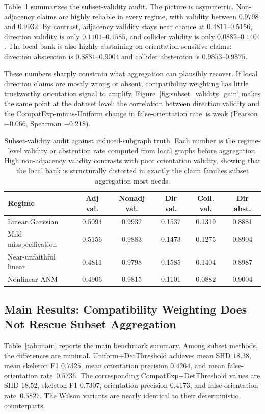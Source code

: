 \documentclass{article}
\newcommand{\method}{CompatExp}
\newcommand{\forate}{false-orientation rate}
\begin{document}
Table~\ref{tab:audit} summarizes the subset-validity audit. The picture is asymmetric. Non-adjacency claims are highly reliable in every regime, with validity between $0.9798$ and $0.9932$. By contrast, adjacency validity stays near chance at $0.4811$--$0.5156$, direction validity is only $0.1101$--$0.1585$, and collider validity is only $0.0882$--$0.1404$. The local bank is also highly abstaining on orientation-sensitive claims: direction abstention is $0.8881$--$0.9004$ and collider abstention is $0.9853$--$0.9875$.

These numbers sharply constrain what aggregation can plausibly recover. If local direction claims are mostly wrong or absent, compatibility weighting has little trustworthy orientation signal to amplify. Figure~\ref{fig:subset_validity_gain} makes the same point at the dataset level: the correlation between direction validity and the \method-minus-Uniform change in \forate\ is weak (Pearson $-0.066$, Spearman $-0.218$).

\begin{table}[t]
\caption{Subset-validity audit against induced-subgraph truth. Each number is the regime-level validity or abstention rate computed from local graphs before aggregation. High non-adjacency validity contrasts with poor orientation validity, showing that the local bank is structurally distorted in exactly the claim families subset aggregation most needs.}
\label{tab:audit}
\centering
\small
\begin{tabular}{lccccc}
\toprule
Regime & Adj val. & Nonadj val. & Dir val. & Coll. val. & Dir abst. \\
\midrule
Linear Gaussian & 0.5094 & 0.9932 & 0.1537 & 0.1319 & 0.8881 \\
Mild misspecification & 0.5156 & 0.9883 & 0.1473 & 0.1275 & 0.8904 \\
Near-unfaithful linear & 0.4811 & 0.9798 & 0.1585 & 0.1404 & 0.8987 \\
Nonlinear ANM & 0.4906 & 0.9815 & 0.1101 & 0.0882 & 0.9004 \\
\bottomrule
\end{tabular}
\end{table}

\subsection{Main Results: Compatibility Weighting Does Not Rescue Subset Aggregation}

Table~\ref{tab:main} reports the main benchmark summary. Among subset methods, the differences are minimal. Uniform+DetThreshold achieves mean SHD $18.38$, mean skeleton F1 $0.7325$, mean orientation precision $0.4264$, and mean \forate\ $0.5736$. The corresponding \method+DetThreshold values are SHD $18.52$, skeleton F1 $0.7307$, orientation precision $0.4173$, and \forate\ $0.5827$. The Wilson variants are nearly identical to their deterministic counterparts.
\end{document}
